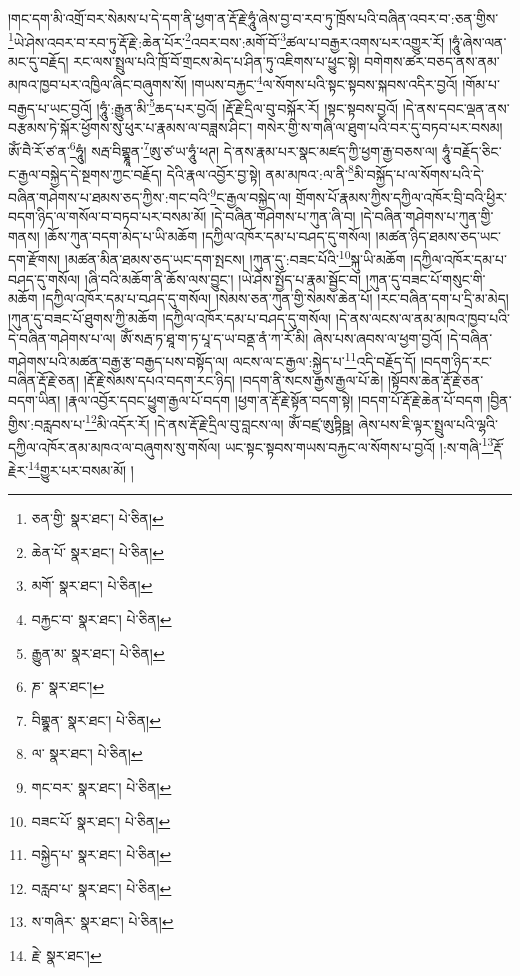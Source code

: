 །གང་དག་མི་འགྲོ་བར་སེམས་པ་དེ་དག་ནི་ཕྱག་ན་རྡོ་རྗེ་ཧཱུཾ་ཞེས་བྱ་བ་རབ་ཏུ་ཁྲོས་པའི་བཞིན་འབར་བ་:ཅན་གྱིས་\footnote{ཅན་གྱི་  སྣར་ཐང་།  པེ་ཅིན། }ཡེ་ཤེས་འབར་བ་རབ་ཏུ་རྡོ་རྗེ་:ཆེན་པོར་\footnote{ཆེན་པོ་  སྣར་ཐང་།  པེ་ཅིན། }འབར་བས་:མགོ་བོ་\footnote{མགོ་  སྣར་ཐང་།  པེ་ཅིན། }ཚལ་པ་བརྒྱར་འགས་པར་འགྱུར་རོ། །ཧཱུཾ་ཞེས་ལན་མང་དུ་བརྗོད། རང་ལས་སྤྲུལ་པའི་ཁྲོ་བོ་གྲངས་མེད་པ་ཤིན་ཏུ་འཇིགས་པ་ཕྱུང་སྟེ། བགེགས་ཚར་བཅད་ནས་ནམ་མཁའ་ཁྱབ་པར་འཁྱིལ་ཞིང་བཞུགས་སོ། །གཡས་བརྐྱང་\footnote{བརྐྱང་བ་  སྣར་ཐང་།  པེ་ཅིན། }ལ་སོགས་པའི་སྟང་སྟབས་སྐབས་འདིར་བྱའོ། །གོམ་པ་བརྒྱད་པ་ཡང་བྱའོ། །ཧཱུཾ་:རྒྱུན་མི་\footnote{རྒྱུན་མ་  སྣར་ཐང་།  པེ་ཅིན། }ཆད་པར་བྱའོ། །རྡོ་རྗེ་དྲིལ་བུ་བསྐོར་རོ། །སྟང་སྟབས་བྱའོ། །དེ་ནས་དབང་ལྡན་ནས་བརྩམས་ཏེ་སྐོར་ཕྱོགས་སུ་ཕུར་པ་རྣམས་ལ་བཟླས་ཤིང་། གསེར་གྱི་ས་གཞི་ལ་ཐུག་པའི་བར་དུ་བཏབ་པར་བསམ། ཨོཾ་བཻ་རོ་ཙ་ན་\footnote{ཎ་  སྣར་ཐང་། }ཧཱུཾ། སརྦ་བིགྷྣཱན་\footnote{བིགྷྣན་  སྣར་ཐང་།  པེ་ཅིན། }ཨུ་ཙ་ཡ་ཧཱུཾ་ཕཊ། དེ་ནས་རྣམ་པར་སྣང་མཛད་ཀྱི་ཕྱག་རྒྱ་བཅས་ལ། ཧཱུཾ་བརྗོད་ཅིང་ང་རྒྱལ་བསྐྱེད་དེ་སྔགས་ཀྱང་བརྗོད། དེའི་རྣལ་འབྱོར་བྱ་སྟེ། ནམ་མཁའ་:ལ་ནི་\footnote{ལ་  སྣར་ཐང་།  པེ་ཅིན། }མི་བསྐྱོད་པ་ལ་སོགས་པའི་དེ་བཞིན་གཤེགས་པ་ཐམས་ཅད་ཀྱིས་:གང་བའི་\footnote{གང་བར་  སྣར་ཐང་།  པེ་ཅིན། }ང་རྒྱལ་བསྐྱེད་ལ། གྲོགས་པོ་རྣམས་ཀྱིས་དཀྱིལ་འཁོར་བྲི་བའི་ཕྱིར་བདག་ཉིད་ལ་གསོལ་བ་བཏབ་པར་བསམ་མོ། །དེ་བཞིན་གཤེགས་པ་ཀུན་ཞི་བ། །དེ་བཞིན་གཤེགས་པ་ཀུན་གྱི་གནས། །ཆོས་ཀུན་བདག་མེད་པ་ཡི་མཆོག །དཀྱིལ་འཁོར་དམ་པ་བཤད་དུ་གསོལ། །མཚན་ཉིད་ཐམས་ཅད་ཡང་དག་རྫོགས། །མཚན་མིན་ཐམས་ཅད་ཡང་དག་སྤངས། །ཀུན་དུ་:བཟང་པོའི་\footnote{བཟང་པོ་  སྣར་ཐང་།  པེ་ཅིན། }སྐུ་ཡི་མཆོག །དཀྱིལ་འཁོར་དམ་པ་བཤད་དུ་གསོལ། །ཞི་བའི་མཆོག་ནི་ཆོས་ལས་བྱུང་། །ཡེ་ཤེས་སྤྱོད་པ་རྣམ་སྦྱོང་བ། །ཀུན་དུ་བཟང་པོ་གསུང་གི་མཆོག །དཀྱིལ་འཁོར་དམ་པ་བཤད་དུ་གསོལ། །སེམས་ཅན་ཀུན་གྱི་སེམས་ཆེན་པོ། །རང་བཞིན་དག་པ་དྲི་མ་མེད། །ཀུན་དུ་བཟང་པོ་ཐུགས་ཀྱི་མཆོག །དཀྱིལ་འཁོར་དམ་པ་བཤད་དུ་གསོལ། །དེ་ནས་ལངས་ལ་ནམ་མཁའ་ཁྱབ་པའི་དེ་བཞིན་གཤེགས་པ་ལ། ཨོཾ་སརྦ་ཏ་ཐཱ་ག་ཏ་པཱ་ད་ཡ་བནྡ་ནཾ་ཀ་རོ་མི། ཞེས་པས་ཞབས་ལ་ཕྱག་བྱའོ། །དེ་བཞིན་གཤེགས་པའི་མཚན་བརྒྱ་རྩ་བརྒྱད་པས་བསྟོད་ལ། ལངས་ལ་ང་རྒྱལ་:སྐྱེད་པ་\footnote{བསྐྱེད་པ་  སྣར་ཐང་།  པེ་ཅིན། }འདི་བརྗོད་དོ། །བདག་ཉིད་རང་བཞིན་རྡོ་རྗེ་ཅན། །རྡོ་རྗེ་སེམས་དཔའ་བདག་རང་ཉིད། །བདག་ནི་སངས་རྒྱས་རྒྱལ་པོ་ཆེ། །སྟོབས་ཆེན་རྡོ་རྗེ་ཅན་བདག་ཡིན། །རྣལ་འབྱོར་དབང་ཕྱུག་རྒྱལ་པོ་བདག །ཕྱག་ན་རྡོ་རྗེ་སྟོན་བདག་སྟེ། །བདག་པོ་རྡོ་རྗེ་ཆེན་པོ་བདག །བྱིན་གྱིས་:བརླབས་པ་\footnote{བརླབ་པ་  སྣར་ཐང་།  པེ་ཅིན། }མི་འདོར་རོ། །དེ་ནས་རྡོ་རྗེ་དྲིལ་བུ་བླངས་ལ། ཨོཾ་བཛྲ་ཨུཏྟིཥྛ། ཞེས་པས་ཇི་ལྟར་སྤྲུལ་པའི་ལྷའི་དཀྱིལ་འཁོར་ནམ་མཁའ་ལ་བཞུགས་སུ་གསོལ། ཡང་སྟང་སྟབས་གཡས་བརྐྱང་ལ་སོགས་པ་བྱའོ། །:ས་གཞི་\footnote{ས་གཞིར་  སྣར་ཐང་།  པེ་ཅིན། }རྡོ་རྗེར་\footnote{རྗེ་  སྣར་ཐང་། }གྱུར་པར་བསམ་མོ། །
